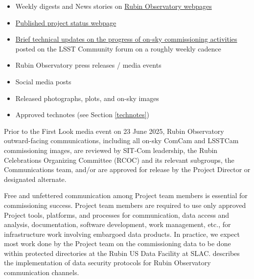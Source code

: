 \documentclass[SE,authoryear,toc]{lsstdoc}
\begin{document}
\begin{itemize}

  \item Weekly digests and News stories on \href{https://rubinobservatory.org/}{Rubin Observatory webpages}

  \item \href{https://www.lsst.org/about/project-status}{Published project status webpage}

  \item \href{https://community.lsst.org/tag/commissioning-update}{Brief technical updates on the progress of on-sky commissioning activities} posted on the LSST Community forum on a roughly weekly cadence

  \item Rubin Observatory press releases / media events

  \item Social media posts

  \item Released photographs, plots, and on-sky images

  \item Approved technotes (see Section \ref{technotes})

\end{itemize}

Prior to the First Look media event on 23 June 2025, Rubin Observatory outward-facing communications, including all on-sky ComCam and LSSTCam commissioning images, are reviewed by SIT-Com leadership, the Rubin Celebrations Organizing Committee (RCOC) and its relevant subgroups, the Communications team, and/or are approved for release by the Project Director or designated alternate.

Free and unfettered communication among Project team members is essential for commissioning success.
Project team members are required to use only approved Project tools, platforms, and processes for communication, data access and analysis, documentation, software development, work management, etc., for infrastructure work involving embargoed data products.
In practice, we expect most work done by the Project team on the commissioning data to be done within protected directories at the Rubin US Data Facility at SLAC.
 describes the implementation of data security protocols for Rubin Observatory communication channels.
\end{document}
